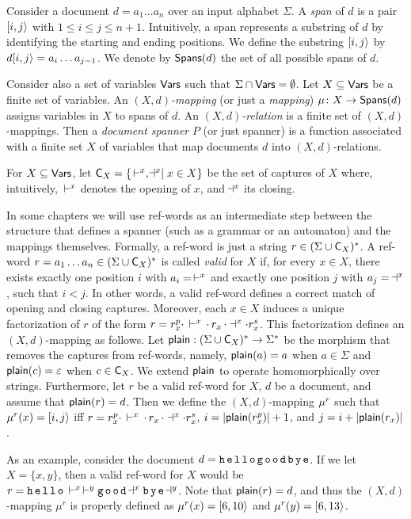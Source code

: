 Consider a document $d = a_1\ldots a_n$ over an input alphabet $\Sigma$. A {\it span} of $d$ is a pair $[i,j\rangle$ with $1 \leq i \leq j \leq n+1$. Intuitively, a span represents a substring of $d$ by identifying the starting and ending positions. We define the substring $[i,j\rangle$ by $d[i,j\rangle = a_i \ldots a_{j-1}$. We denote by $\mathsf{Spans}(d)$ the set of all possible spans of $d$.

Consider also a set of variables $\mathsf{Vars}$ such that $\Sigma \cap \mathsf{Vars} = \emptyset$. Let $X \subseteq \mathsf{Vars}$ be a finite set of variables. An \emph{$(X, d)$-mapping} (or just a \emph{mapping}) $\mu\colon X \rightarrow \mathsf{Spans}(d)$ assigns variables in $X$ to spans of $d$. An \emph{$(X, d)$-relation} is a finite set of $(X, d)$-mappings. Then a \emph{document spanner} $P$ (or just spanner) is a function associated with a finite set $X$ of variables that map documents $d$ into $(X, d)$-relations.  

For $X \subseteq \mathsf{Vars}$, let $\textsf{C}_{X} = \{\, \vdash^{x}, \!\dashv^{x}\mid x\in X\}$ be the set of captures of $X$ where, intuitively, $\, \vdash^{x}$ denotes the opening of $x$, and $\!\dashv^{x}$ its closing. 

In some chapters we will use ref-words as an intermediate step between the structure that defines a spanner (such as a grammar or an automaton) and the mappings themselves.
Formally, a ref-word is just a string $r\in (\Sigma \cup \textsf{C}_{X})^*$. A ref-word $r = a_1 \ldots a_n \in (\Sigma \cup \textsf{C}_{X})^*$ is called {\it valid} for $X$ if, for every $x \in X$, there exists exactly one position $i$ with $a_i = \, \vdash^{x}$ and exactly one position $j$ with $a_j = \ \!\dashv^{x}$, such that $i < j$. 
In other words, a valid ref-word defines a correct match of opening and closing captures. Moreover, each $x \in X$ induces a unique factorization of $r$ of the form $r = r_x^p \cdot \, \vdash^{x} \, \cdot \, r_x \, \cdot\, \!\dashv^{x} \cdot r_x^s$. 
This factorization defines an $(X,d)$-mapping as follows. 
Let $\textsf{plain}: (\Sigma \cup \textsf{C}_{X})^* \rightarrow \Sigma^*$ be the morphism that removes the captures from ref-words, namely, $\textsf{plain}(a) = a$ when $a \in \Sigma$ and $\textsf{plain}(c) = \varepsilon$ when $c \in \textsf{C}_{X}$.
We extend $\textsf{plain}$ to operate homomorphically over strings.
Furthermore, let $r$ be a valid ref-word for $X$, $d$ be a document, and assume that $\textsf{plain}(r) = d$.
Then we define the $(X,d)$-mapping $\mu^r$ such that $\mu^r(x) = [i,j\rangle$ iff $r = r_x^p \cdot \, \vdash^{x} \, \cdot \, r_x \, \cdot\, \!\dashv^{x} \cdot r_x^s$, $i = |\textsf{plain}(r_x^p)|+1$, and $j = i + |\textsf{plain}(r_x)|$. 

As an example, consider the document $d = {\tt h\,e\,l\,l\,o\,g\,o\,o\,d\,b\,y\,e}$. 
If we let $X = \{x, y\}$, then a valid ref-word for $X$ would be $r = {\tt h\,e\,l\,l\,o}\, \vdash^{x}\, \vdash^{y}{\tt g\,o\,o\,d}\!\dashv^{x}{\tt b\,y\,e}\!\dashv^{y}$. Note that $\textsf{plain}(r) = d$, and thus the $(X,d)$-mapping $\mu^r$ is properly defined as $\mu^r(x) = [6,10\rangle$ and $\mu^r(y) = [6,13\rangle$.